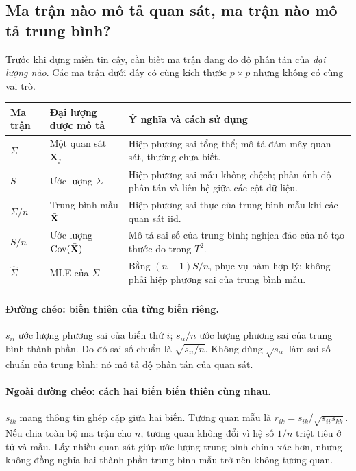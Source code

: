 \subsection{Ma trận nào mô tả quan sát, ma trận nào mô tả trung bình?}
\label{sec:covariance_roles}
Trước khi dựng miền tin cậy, cần biết ma trận đang đo độ phân tán của
\emph{đại lượng nào}. Các ma trận dưới đây có cùng kích thước $p\times p$
nhưng không có cùng vai trò.
\begin{center}
\small
\begin{tabular}{L{.19\linewidth}L{.25\linewidth}L{.44\linewidth}}
\toprule
Ma trận & Đại lượng được mô tả & Ý nghĩa và cách sử dụng\\
\midrule
$\Sigma$ & Một quan sát $\mathbf X_j$ & Hiệp phương sai tổng thể;
 mô tả đám mây quan sát, thường chưa biết.\\[3pt]
$S$ & Ước lượng $\Sigma$ & Hiệp phương sai mẫu không chệch;
 phản ánh độ phân tán và liên hệ giữa các cột dữ liệu.\\[3pt]
$\Sigma/n$ & Trung bình mẫu $\bar{\mathbf X}$ & Hiệp phương sai thực của trung bình
 mẫu khi các quan sát iid.\\[3pt]
$S/n$ & Ước lượng $\operatorname{Cov}(\bar{\mathbf X})$ & Mô tả sai số của trung bình;
 nghịch đảo của nó tạo thước đo trong $T^2$.\\[3pt]
$\widehat\Sigma$ & MLE của $\Sigma$ & Bằng $(n-1)S/n$, phục vụ hàm hợp
 lý; không phải hiệp phương sai của trung bình mẫu.\\
\bottomrule
\end{tabular}
\end{center}

\paragraph{Đường chéo: biến thiên của từng biến riêng.}
$s_{ii}$ ước lượng phương sai của biến thứ $i$; $s_{ii}/n$ ước lượng
phương sai của trung bình thành phần. Do đó sai số chuẩn là
$\sqrt{s_{ii}/n}$. Không dùng $\sqrt{s_{ii}}$ làm sai số chuẩn của
trung bình: nó mô tả độ phân tán của quan sát.

\paragraph{Ngoài đường chéo: cách hai biến biến thiên cùng nhau.}
$s_{ik}$ mang thông tin ghép cặp giữa hai biến. Tương quan mẫu là
$r_{ik}=s_{ik}/\sqrt{s_{ii}s_{kk}}$. Nếu chia toàn bộ ma trận cho $n$,
tương quan không đổi vì hệ số $1/n$ triệt tiêu ở tử và mẫu.
Lấy nhiều quan sát giúp ước lượng trung bình chính xác hơn, nhưng không
đồng nghĩa hai thành phần trung bình mẫu trở nên không tương quan.


